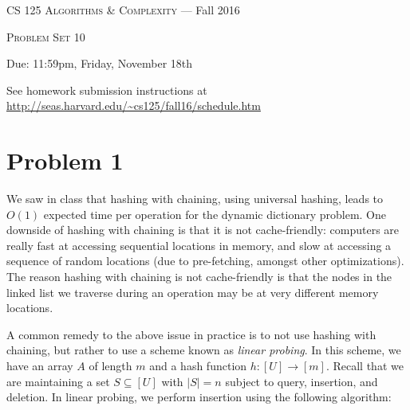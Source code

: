 \documentclass[12pt]{article}
\begin{document}
\thispagestyle{empty}

\begin{center}
{\Large \textsc{CS 125 Algorithms \& Complexity} --- Fall 2016}

\bigskip

{\Large \textsc{Problem Set 10}}

\smallskip

Due: 11:59pm, Friday, November 18th

\bigskip

{\footnotesize See homework submission instructions at \url{http://seas.harvard.edu/~cs125/fall16/schedule.htm}}
\end{center}


\section*{Problem 1} 

We saw in class that hashing with chaining, using universal hashing, leads to $O(1)$ expected time per operation for the dynamic dictionary problem. One downside of hashing with chaining is that it is not cache-friendly: computers are really fast at accessing sequential locations in memory, and slow at accessing a sequence of random locations (due to pre-fetching, amongst other optimizations). The reason hashing with chaining is not cache-friendly is that the nodes in the linked list we traverse during an operation may be at very different memory locations.

A common remedy to the above issue in practice is to not use hashing with chaining, but rather to use a scheme known as {\em linear probing}. In this scheme, we have an array $A$ of length $m$ and a hash function $h:[U]\rightarrow[m]$. Recall that we are maintaining a set $S\subseteq[U]$ with $|S| = n$ subject to query, insertion, and deletion. In linear probing, we perform insertion using the following algorithm:
\end{document}
